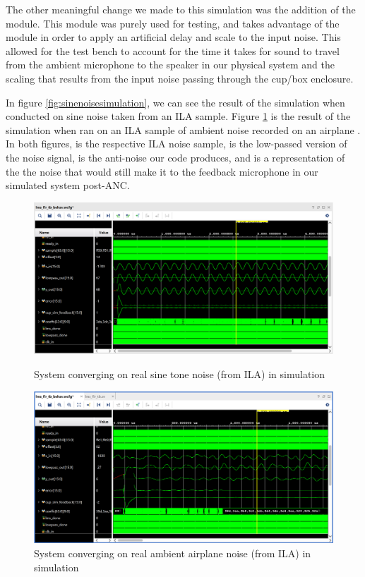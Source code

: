 \documentclass{fpgairpods}
\begin{document}
The other meaningful change we made to this simulation was the addition of the  module. This module was purely used for testing, and takes advantage of the  module in order to apply an artificial delay and scale to the input noise. This allowed for the test bench to account for the time it takes for sound to travel from the ambient microphone to the speaker in our physical system and the scaling that results from the input noise passing through the cup/box enclosure.

In figure \ref{fig:sinenoisesimulation}, we can see the result of the simulation when conducted on sine noise taken from an ILA sample. Figure \ref{fig:ambientnoisesimulation} is the result of the simulation when ran on an ILA sample of ambient noise recorded on an airplane \cite{airplane}. In both figures,  is the respective ILA noise sample,  is the low-passed version of the noise signal,  is the anti-noise our code produces, and  is a representation of the the noise that would still make it to the feedback microphone in our simulated system post-ANC.

\begin{figure}
\centering
\includegraphics[width=450pt]{./figs/nlms_test_bench_sine_ila.png}
\caption{System converging on real sine tone noise (from ILA) in simulation}
\label{fig:sinenoisesimulation}

\bigskip
\includegraphics[width=450pt]{./figs/nlms_test_bench_plane_ila.png}
\caption{System converging on real ambient airplane noise (from ILA) in simulation}
\label{fig:ambientnoisesimulation}
\end{figure}
\end{document}
